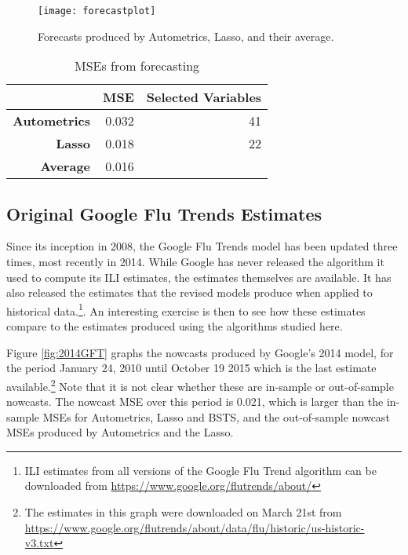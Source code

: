 \begin{figure}[h]
\centering
\texttt{[image: forecastplot]}
\caption{Forecasts produced by Autometrics, Lasso, and their average.}
\label{fig:Forecasts}
\end{figure}


\begin{table}[h]
\centering
\begin{tabular}{r|rr}
 & \textbf{MSE} &\textbf{Selected Variables} \\
 \hline
\textbf{Autometrics} & 0.032 & 41\\
\textbf{Lasso} & 0.018 & 22 \\
\hline
\textbf{Average} & 0.016 &  \\
    \end{tabular}%
      \caption{MSEs from forecasting}
  \label{tab:MSEforecasts}%
\end{table}%












\subsection{Original Google Flu Trends Estimates}

Since its inception in 2008, the Google Flu Trends model has been updated three times, most recently in 2014. While Google has never released the algorithm it used to compute its ILI estimates, the estimates themselves are available. It has also released the estimates that the revised models produce when applied to historical data.\footnote{ILI estimates from all versions of the Google Flu Trend algorithm can be downloaded from \url{https://www.google.org/flutrends/about/}}. An interesting exercise is then to see how these estimates compare to the estimates produced using the algorithms studied here. 

Figure \ref{fig:2014GFT} graphs the nowcasts produced by Google's 2014 model, for the period January 24, 2010 until October 19 2015 which is the last estimate available.\footnote{The estimates in this graph were downloaded on March 21st from \url{https://www.google.org/flutrends/about/data/flu/historic/us-historic-v3.txt}} Note that it is not clear whether these are in-sample or out-of-sample nowcasts. The nowcast MSE over this period is 0.021, which is larger than the in-sample MSEs for Autometrics, Lasso and BSTS, and the out-of-sample nowcast MSEs produced by Autometrics and the Lasso. 


